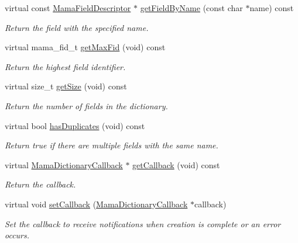 \begin{DoxyCompactItemize}
virtual const \hyperlink{classWombat_1_1MamaFieldDescriptor}{MamaFieldDescriptor} $\ast$ \hyperlink{classWombat_1_1MamaDictionary_a6ee544d8144978bf2e49a1962dea9026}{getFieldByName} (const char $\ast$name) const 
\begin{DoxyCompactList}\small\item\em Return the field with the specified name. \item\end{DoxyCompactList}\item 
virtual mama\_\-fid\_\-t \hyperlink{classWombat_1_1MamaDictionary_ab4bfc4aece1df3434197b883fedfc277}{getMaxFid} (void) const 
\begin{DoxyCompactList}\small\item\em Return the highest field identifier. \item\end{DoxyCompactList}\item 
virtual size\_\-t \hyperlink{classWombat_1_1MamaDictionary_af48a73aa0079ff9ec526db90ca209579}{getSize} (void) const 
\begin{DoxyCompactList}\small\item\em Return the number of fields in the dictionary. \item\end{DoxyCompactList}\item 
virtual bool \hyperlink{classWombat_1_1MamaDictionary_a3d75c1b4461c1dab591f7ac030ab6fed}{hasDuplicates} (void) const 
\begin{DoxyCompactList}\small\item\em Return true if there are multiple fields with the same name. \item\end{DoxyCompactList}\item 
virtual \hyperlink{classWombat_1_1MamaDictionaryCallback}{MamaDictionaryCallback} $\ast$ \hyperlink{classWombat_1_1MamaDictionary_a5083693551dcd12ac87f4f7fb635f53c}{getCallback} (void) const 
\begin{DoxyCompactList}\small\item\em Return the callback. \item\end{DoxyCompactList}\item 
virtual void \hyperlink{classWombat_1_1MamaDictionary_aa40c49fc374c99b872bc7654d57a6253}{setCallback} (\hyperlink{classWombat_1_1MamaDictionaryCallback}{MamaDictionaryCallback} $\ast$callback)
\begin{DoxyCompactList}\small\item\em Set the callback to receive notifications when creation is complete or an error occurs. \item\end{DoxyCompactList}\item 

\end{DoxyCompactItemize}
